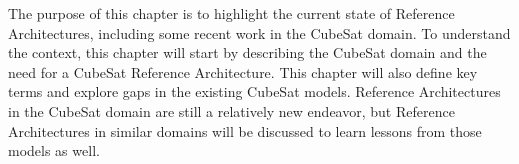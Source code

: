 The purpose of this chapter is to highlight the current state of Reference Architectures, including some recent work in the CubeSat domain. To understand the context, this chapter will start by describing the CubeSat domain and the need for a CubeSat Reference Architecture. This chapter will also define key terms and explore gaps in the existing CubeSat models. Reference Architectures in the CubeSat domain are still a relatively new endeavor, but Reference Architectures in similar domains will be discussed to learn lessons from those models as well. 

